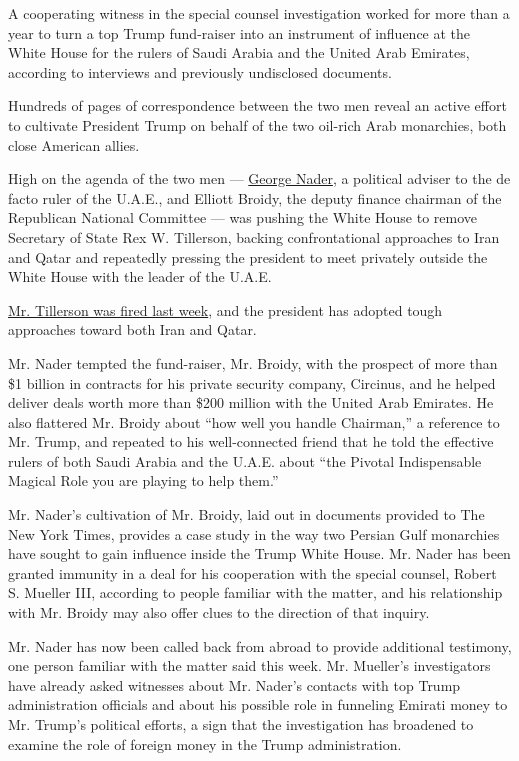 A cooperating witness in the special counsel investigation worked for
more than a year to turn a top Trump fund-raiser into an instrument of
influence at the White House for the rulers of Saudi Arabia and the
United Arab Emirates, according to interviews and previously undisclosed
documents.

Hundreds of pages of correspondence between the two men reveal an active
effort to cultivate President Trump on behalf of the two oil-rich Arab
monarchies, both close American allies.

High on the agenda of the two men ---
\href{https://www.nytimes.com/2018/03/06/us/politics/george-nader-special-counsel-mueller-cooperating-seychelles.html}{George
Nader}, a political adviser to the de facto ruler of the U.A.E., and
Elliott Broidy, the deputy finance chairman of the Republican National
Committee --- was pushing the White House to remove Secretary of State
Rex W. Tillerson, backing confrontational approaches to Iran and Qatar
and repeatedly pressing the president to meet privately outside the
White House with the leader of the U.A.E.

\href{https://www.nytimes.com/2018/03/13/us/politics/trump-tillerson-pompeo.html?action=click\&module=Top\%20Stories\&pgtype=Homepage}{Mr.
Tillerson was fired last week}, and the president has adopted tough
approaches toward both Iran and Qatar.

Mr. Nader tempted the fund-raiser, Mr. Broidy, with the prospect of more
than \$1 billion in contracts for his private security company,
Circinus, and he helped deliver deals worth more than \$200 million with
the United Arab Emirates. He also flattered Mr. Broidy about ``how well
you handle Chairman,'' a reference to Mr. Trump, and repeated to his
well-connected friend that he told the effective rulers of both Saudi
Arabia and the U.A.E. about ``the Pivotal Indispensable Magical Role you
are playing to help them.''

Mr. Nader's cultivation of Mr. Broidy, laid out in documents provided to
The New York Times, provides a case study in the way two Persian Gulf
monarchies have sought to gain influence inside the Trump White House.
Mr. Nader has been granted immunity in a deal for his cooperation with
the special counsel, Robert S. Mueller III, according to people familiar
with the matter, and his relationship with Mr. Broidy may also offer
clues to the direction of that inquiry.

Mr. Nader has now been called back from abroad to provide additional
testimony, one person familiar with the matter said this week. Mr.
Mueller's investigators have already asked witnesses about Mr. Nader's
contacts with top Trump administration officials and about his possible
role in funneling Emirati money to Mr. Trump's political efforts, a sign
that the investigation has broadened to examine the role of foreign
money in the Trump administration.

